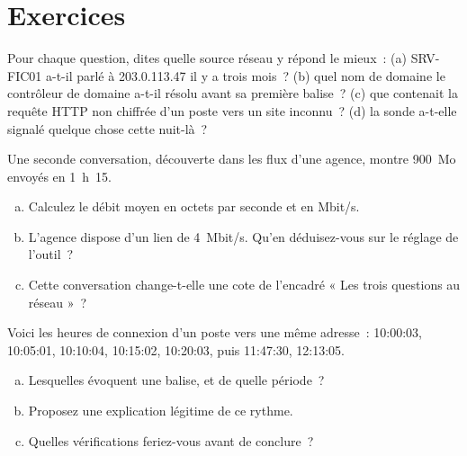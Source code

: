 \section*{Exercices}

\begin{boxexo}[title={\ding{45}\quad Exercice~6.1. Quelle source~? \niveaubase}]
Pour chaque question, dites quelle source réseau y répond le mieux~:
(a) SRV-FIC01 a-t-il parlé à 203.0.113.47 il y a trois mois~? (b) quel nom
de domaine le contrôleur de domaine a-t-il résolu avant sa première balise~?
(c) que contenait la requête HTTP non chiffrée d'un poste vers un site
inconnu~? (d) la sonde a-t-elle signalé quelque chose cette nuit-là~?
\end{boxexo}

\begin{boxexo}[title={\ding{45}\quad Exercice~6.2. Le calcul du débit \niveaumoyen}]
Une seconde conversation, découverte dans les flux d'une agence, montre
900~Mo envoyés en 1~h~15.
\begin{enumerate}[(a)]
    \item Calculez le débit moyen en octets par seconde et en Mbit/s.
    \item L'agence dispose d'un lien de 4~Mbit/s. Qu'en déduisez-vous sur le
          réglage de l'outil~?
    \item Cette conversation change-t-elle une cote de l'encadré « Les trois
          questions au réseau »~?
\end{enumerate}
\end{boxexo}

\begin{boxexo}[title={\ding{45}\quad Exercice~6.3. Une balise ou pas \niveaumoyen}]
Voici les heures de connexion d'un poste vers une même adresse~: 10:00:03,
10:05:01, 10:10:04, 10:15:02, 10:20:03, puis 11:47:30, 12:13:05.
\begin{enumerate}[(a)]
    \item Lesquelles évoquent une balise, et de quelle période~?
    \item Proposez une explication légitime de ce rythme.
    \item Quelles vérifications feriez-vous avant de conclure~?
\end{enumerate}
\end{boxexo}

